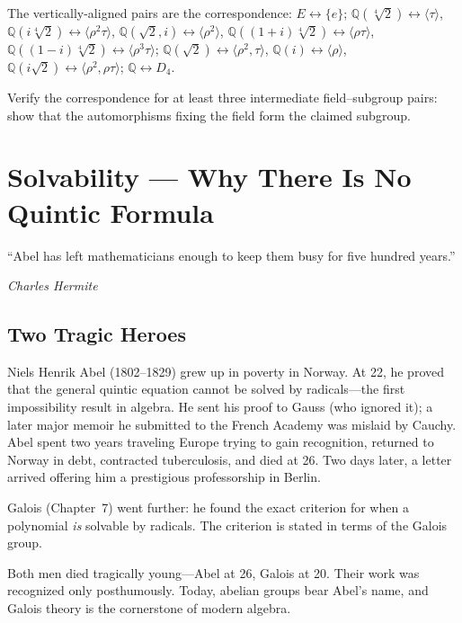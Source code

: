 \documentclass[11pt, a4paper, oneside]{book}
\newcommand{\Q}{\mathbb{Q}}
\newcounter{exercise}[chapter]
\begin{document}
\noindent The vertically-aligned pairs are the correspondence:
$E\leftrightarrow\{e\}$;
$\Q(\sqrt[4]{2})\leftrightarrow\langle\tau\rangle$,
$\Q(i\sqrt[4]{2})\leftrightarrow\langle\rho^2\tau\rangle$,
$\Q(\sqrt{2},i)\leftrightarrow\langle\rho^2\rangle$,
$\Q((1{+}i)\sqrt[4]{2})\leftrightarrow\langle\rho\tau\rangle$,
$\Q((1{-}i)\sqrt[4]{2})\leftrightarrow\langle\rho^3\tau\rangle$;
$\Q(\sqrt{2})\leftrightarrow\langle\rho^2,\tau\rangle$,
$\Q(i)\leftrightarrow\langle\rho\rangle$,
$\Q(i\sqrt{2})\leftrightarrow\langle\rho^2,\rho\tau\rangle$;
$\Q\leftrightarrow D_4$.

\begin{exercisebox}[title={Exercise 9.1}]
Verify the correspondence for at least three intermediate field--subgroup
pairs: show that the automorphisms fixing the field form the claimed subgroup.
\end{exercisebox}

\chapter{Solvability --- Why There Is No Quintic Formula}

\epigraph{``Abel has left mathematicians enough to keep them busy for five
hundred years.''}{\textit{Charles Hermite}}

\section{Two Tragic Heroes}

\begin{historical}[title={Abel and Galois}]
Niels Henrik Abel (1802--1829) grew up in poverty in Norway. At 22, he proved
that the general quintic equation cannot be solved by radicals---the first
impossibility result in algebra. He sent his proof to Gauss (who ignored it);
a later major memoir he submitted to the French Academy was mislaid by Cauchy. Abel spent two
years traveling Europe trying to gain recognition, returned to Norway in debt,
contracted tuberculosis, and died at 26. Two days later, a letter arrived
offering him a prestigious professorship in Berlin.

Galois (Chapter~7) went further: he found the exact criterion for when a
polynomial \emph{is} solvable by radicals. The criterion is stated in terms of
the Galois group.

Both men died tragically young---Abel at 26, Galois at 20. Their work was
recognized only posthumously. Today, abelian groups bear Abel's name, and
Galois theory is the cornerstone of modern algebra.
\end{historical}
\end{document}
